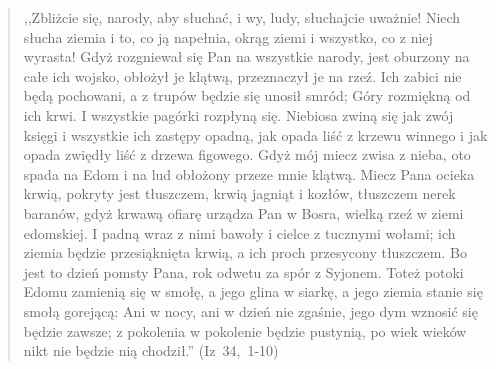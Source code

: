 \documentclass[10pt,a4paper,oneside]{article}
\begin{document}
\begin{quote}
,,Zbliżcie się, narody, aby słuchać, i wy, ludy, słuchajcie uważnie! Niech słucha ziemia i to, co ją napełnia, okrąg ziemi i wszystko, co z niej wyrasta! Gdyż rozgniewał się Pan na wszystkie narody, jest oburzony na całe ich wojsko, obłożył je klątwą, przeznaczył je na rzeź. Ich zabici nie będą pochowani, a z trupów będzie się unosił smród; Góry rozmiękną od ich krwi. I wszystkie pagórki rozpłyną się. Niebiosa zwiną się jak zwój księgi i wszystkie ich zastępy opadną, jak opada liść z krzewu winnego i jak opada zwiędły liść z drzewa figowego. Gdyż mój miecz zwisa z nieba, oto spada na Edom i na lud obłożony przeze mnie klątwą. Miecz Pana ocieka krwią, pokryty jest tłuszczem, krwią jagniąt i kozłów, tłuszczem nerek baranów, gdyż krwawą ofiarę urządza Pan w Bosra, wielką rzeź w ziemi edomskiej. I padną wraz z nimi bawoły i cielce z tucznymi wołami; ich ziemia będzie przesiąknięta krwią, a ich proch przesycony tłuszczem. Bo jest to dzień pomsty Pana, rok odwetu za spór z Syjonem. Toteż potoki Edomu zamienią się w smołę, a jego glina w siarkę, a jego ziemia stanie się smołą gorejącą: Ani w nocy, ani w dzień nie zgaśnie, jego dym wznosić się będzie zawsze; z pokolenia w pokolenie będzie pustynią, po wiek wieków nikt nie będzie nią chodził.'' \mbox{(Iz 34, 1-10)}
\end{quote}
\end{document}
